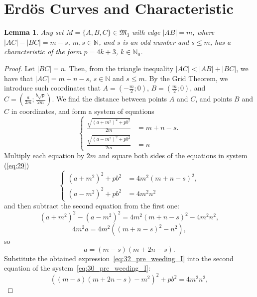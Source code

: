 \documentclass[a4paper,14pt]{article} %
\theoremstyle{plain}
\newtheorem{lemma}[theorem]{Lemma}
\theoremstyle{definition}
\begin{document}
\section{Erdös Curves and Characteristic}

\begin{lemma}
	\label{lem:pre_weeding_I}
	Any set $M = \{A, B, C\} \in \mathfrak{M}_3$ with edge $|AB| = m$, where $|AC| - |BC| = m - s$, $m, s \in \mathbb{N}$, and $s$ is an odd number and $s \leq m$, has a characteristic of the form $p = 4k + 3$, $k \in \mathbb{N}_0$.
\end{lemma}

\begin{proof}
	Let $|BC| = n$. Then, from the triangle inequality $|AC| < |AB| + |BC|$, we have that $|AC| = m + n - s$, $s \in \mathbb{N}$ and $s \leq m$. By the Grid Theorem, we introduce such coordinates that $A = (-\frac{m}{2}; 0)$, $B = (\frac{m}{2}; 0)$, and $C = (\frac{a}{2m}; \frac{b\sqrt{p}}{2m})$. We find the distance between points $A$ and $C$, and points $B$ and $C$ in coordinates, and form a system of equations
	\begin{equation}
		\label{eq:29}
		\begin{cases}
		\frac{\sqrt{(a+m^2)^2+pb^2}}{2m}&=m+n-s.\\
		\frac{\sqrt{(a-m^2)^2+pb^2}}{2m}&=n
		\end{cases}
	\end{equation}
	Multiply each equation by $2m$ and square both sides of the equations in system (\ref{eq:29})
	\begin{equation}
		\label{eq:30_pre_weeding_I}
		\begin{cases}
		(a+m^2)^2+pb^2&=4m^2(m+n-s)^2,\\
		(a-m^2)^2+pb^2&=4m^2n^2
		\end{cases}
	\end{equation}
	and then subtract the second equation from the first one:
	\begin{equation}
	(a+m^2)^2-(a-m^2)^2=4m^2(m+n-s)^2-4m^2n^2,
	\label{eq: 31}
	\end{equation}
	$$
	4m^2a=4m^2((m+n-s)^2-n^2),
	$$
	so
	\begin{equation}
		\label{eq:32_pre_weeding_I}
		a=(m-s)(m+2n-s).
	\end{equation}
	Substitute the obtained expression~\eqref{eq:32_pre_weeding_I}
	into the second equation of the system~\eqref{eq:30_pre_weeding_I}:
	\begin{equation}
		((m-s)(m+2n-s)-m^2)^2+pb^2=4m^2n^2,
	\end{equation}

\end{proof}
\end{document}
